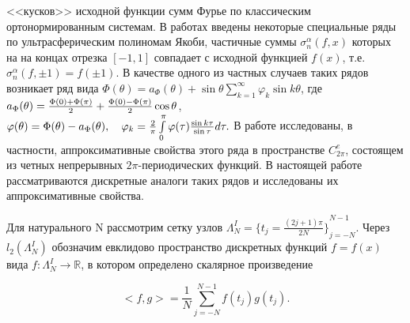 <<кусков>> исходной функции сумм Фурье по классическим
ортонормированным системам. В работах \cite{shii1, shii2} введены некоторые специальные ряды по ультрасферическим полиномам Якоби, частичные суммы $\sigma_n^\alpha(f,x)$ которых на на концах отрезка $[-1,1]$ совпадает с исходной функцией $f(x)$, т.е. $\sigma_n^\alpha(f,\pm1)=f(\pm1)$.
В качестве одного из частных случаев таких рядов возникает ряд вида $\Phi(\theta)=a_\Phi(\theta)+\sin\theta \sum_{k=1}^\infty\varphi_k\sin k \theta$,
где $a_\Phi(\theta)={\Phi(0)+\Phi(\pi)\over2}+{\Phi(0)-\Phi(\pi)\over2}\cos\theta$,
$\varphi(\theta)=\Phi(\theta)-a_\Phi(\theta),\quad \varphi_k={\frac2\pi}
\int\limits_{0}^\pi \varphi(\tau){\sin k\tau\over\sin\tau}d\tau.$
В работе \cite{shii2} исследованы, в частности, аппроксимативные свойства этого ряда в пространстве $C^e_{2\pi}$, состоящем из четных непрерывных $2\pi$-периодических функций. В настоящей работе рассматриваются дискретные аналоги таких рядов и исследованы их аппроксимативные свойства.

Для натурального N рассмотрим сетку узлов
$\Lambda^I_N = { \{ t_j = \frac{(2j+1)\pi}{2N} \} }_{j=-N}^{N-1}$.
Через $l_2 (\Lambda^I_N)$ обозначим евклидово пространство дискретных функций $f=f(x)$ вида $f : \Lambda^I_N \rightarrow \mathbb{R} $,
в котором определено скалярное произведение

\begin{equation}
  <f,g> = \frac{1}{N}\sum\limits_{j=-N}^{N-1} f(t_j)g(t_j). \label{iish_gga_1}
\end{equation}

